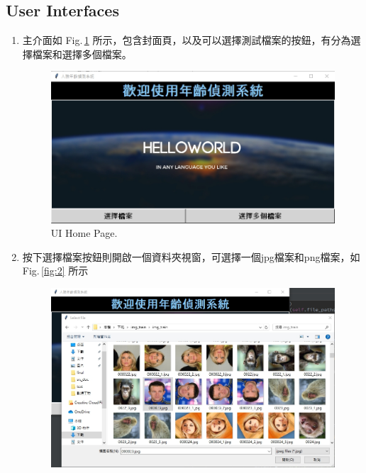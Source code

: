 \documentclass{scrreprt}
\begin{document}
\begin{CJK}{UTF8}{bkai}
\section{User Interfaces}
\vspace{0.9cm}
\begin{enumerate}
    \item 主介面如 Fig.\,\ref{fig:1} 所示，包含封面頁，以及可以選擇測試檔案的按鈕，有分為選擇檔案和選擇多個檔案。\\
    \begin{figure}[htb]
        \begin{center}
            \includegraphics[scale=0.7]{image/UiHomePage.png}%
        \end{center}
        \caption{UI Home Page.}
        \label{fig:1}
    \end{figure}
    \vspace{7.0cm}
    \item 按下選擇檔案按鈕則開啟一個資料夾視窗，可選擇一個jpg檔案和png檔案，如 Fig.\,\ref{fig:2} 所示\\
    \begin{figure}[htb]
        \begin{center}
            \includegraphics[scale=0.6]{image/UiSelectFileOne.png}%

\end{center}
\end{figure}
\end{enumerate}
\end{CJK}
\end{document}
